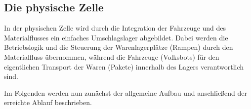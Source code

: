 \subsection{Die physische Zelle}
In der physischen Zelle wird durch die Integration der Fahrzeuge und des Materialflusses ein einfaches Umschlagslager abgebildet. Dabei werden die Betriebslogik und die Steuerung der Warenlagerplätze (Rampen) durch den Materialfluss übernommen, während die Fahrzeuge (Volksbots) für den eigentlichen Transport der Waren (Pakete) innerhalb des Lagers verantwortlich sind.

Im Folgenden werden nun zunächst der allgemeine Aufbau und anschließend der erreichte Ablauf beschrieben.




